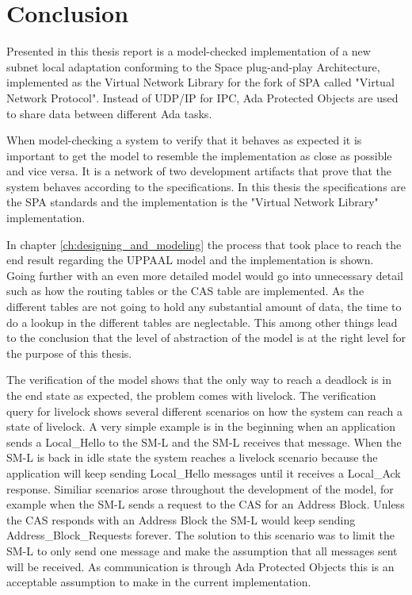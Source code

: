 \chapter{Conclusion}\label{ch:conclusion}
Presented in this thesis report is a model-checked implementation of a new
subnet local adaptation conforming to the Space plug-and-play Architecture,
implemented as the Virtual Network Library \cite{web:github-vn-lib} for the
fork of SPA called "Virtual Network Protocol". Instead of UDP/IP for IPC, Ada
Protected Objects are used to share data between different Ada tasks.

When model-checking a system to verify that it behaves as expected it is
important to get the model to resemble the implementation as close as possible
and vice versa. It is a network of two development artifacts that prove that the
system behaves according to the specifications. In this thesis the
specifications are the SPA standards and the implementation is the "Virtual
Network Library" implementation.

In chapter \ref{ch:designing_and_modeling} the process that took place to reach
the end result regarding the UPPAAL model and the implementation is
shown. Going further with an even more detailed model would go into
unnecessary detail such as how the routing tables or the CAS table are
implemented. As the different tables are not going to hold any substantial
amount of data, the time to do a lookup in the different tables are
neglectable. This among other things lead to the conclusion that the level of
abstraction of the model is at the right level for the purpose of this thesis.

The verification of the model shows that the only way to reach a deadlock is in
the end state as expected, the problem comes with livelock. The
verification query for livelock shows several different scenarios on how the
system can reach a state of livelock. A very simple example is in the beginning
when an application sends a Local\_Hello to the SM-L and the SM-L receives that
message. When the SM-L is back in idle state the system reaches a livelock
scenario because the application will keep sending Local\_Hello messages
until it receives a Local\_Ack response. Similiar scenarios arose throughout
the development of the model, for example when the SM-L sends a request to
the CAS for an Address Block. Unless the CAS responds with an Address Block the
SM-L would keep sending Address\_Block\_Requests forever. The solution to this
scenario was to limit the SM-L to only send one message and make the
assumption that all messages sent will be received. As communication is through
Ada Protected Objects this is an acceptable assumption to make in the current
implementation.

